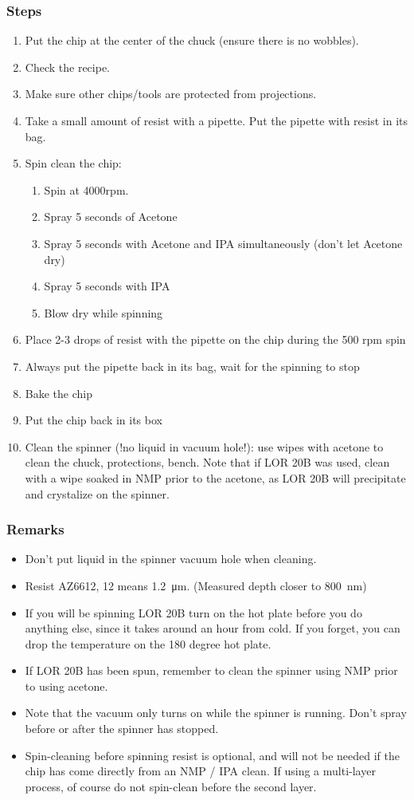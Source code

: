 \subsubsection{Steps}
\begin{enumerate}
\item Put the chip at the center of the chuck (ensure there is no wobbles).
\item Check the recipe.
\item Make sure other chips/tools are protected from projections.
\item Take a small amount of resist with a pipette. Put the pipette with resist in its bag.
\item Spin clean the chip:
\begin{enumerate}
\item Spin at 4000rpm.
\item Spray 5 seconds of Acetone
\item Spray 5 seconds with Acetone and IPA simultaneously (don't let Acetone dry)
\item Spray 5 seconds with IPA
\item Blow dry while spinning
\end{enumerate}
\item Place 2-3 drops of resist with the pipette on the chip during the 500 rpm spin
\item Always put the pipette back in its bag, wait for the spinning to stop
\item Bake the chip
\item Put the chip back in its box
\item Clean the spinner (!no liquid in vacuum hole!): use wipes with acetone to clean the chuck, protections, bench. Note that if LOR 20B was used, clean with a wipe soaked in NMP prior to the acetone, as LOR 20B will precipitate and crystalize on the spinner.
\end{enumerate}

\subsubsection{Remarks}
\begin{itemize}
\item Don't put liquid in the spinner vacuum hole when cleaning.
\item Resist AZ6612, 12 means \SI{1.2}{\micro\meter}. (Measured depth closer to \SI{800}{\nano\meter})
\item If you will be spinning LOR 20B turn on the hot plate before you do anything else, since it takes around an hour from cold. If you forget, you can drop the temperature on the 180 degree hot plate.
\item If LOR 20B has been spun, remember to clean the spinner using NMP prior to using acetone.
\item Note that the vacuum only turns on while the spinner is running. Don't spray before or after the spinner has stopped.
\item Spin-cleaning before spinning resist is optional, and will not be needed if the chip has come directly from an NMP / IPA clean. If using a multi-layer process, of course do not spin-clean before the second layer.
\end{itemize}

\newpage
